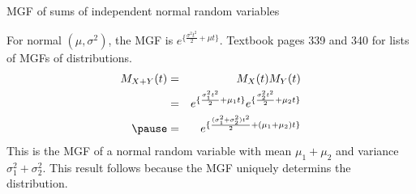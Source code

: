 \documentclass[slidestop,compress,mathserif]{beamer}
\begin{document}
\begin{frame}{MGF of sums of independent normal random variables}

For normal $(\mu, \sigma^2)$, the MGF is $e^{\{\frac{\sigma^2t^2}{2} + \mu t\}}$. {\color{red} Textbook pages 339 and 340 for lists of MGFs of distributions.}
\pause
{\small{
\begin{eqnarray*}
M_{X+Y}(t) &=& M_X(t)M_Y(t) \\
&=&
e^{\{\frac{\sigma_1^2t^2}{2} + \mu_1t\}}e^{\{\frac{\sigma_2^2t^2}{2} + \mu_2t\}}\\
\pause
&=&
e^{\{\frac{(\sigma_1^2 + \sigma_2^2)t^2}{2}+(\mu_1 + \mu_2)t\}}
\end{eqnarray*}
\pause
This is the MGF of a normal random variable with mean $\mu_1+\mu_2$ and variance $\sigma_1^2+\sigma_2^2$. This result follows because the MGF uniquely determins the distribution.
}}
\end{frame}
\end{document}

